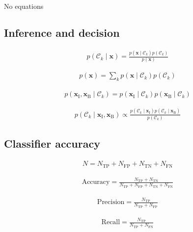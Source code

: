 \documentclass{article}
\begin{document}
No equations

\subsection{Inference and decision}

\begin{align*}
p\left(\mathcal{C}_k \mid \mathbf{x}\right) = \frac{p\left(\mathbf{x} \mid \mathcal{C}_k\right) p\left(\mathcal{C}_k\right)}{p(\mathbf{x})}
\tag{5.24}
\end{align*}

\begin{align*}
p(\mathbf{x}) = \sum_k p\left(\mathbf{x} \mid \mathcal{C}_k\right) p\left(\mathcal{C}_k\right)
\tag{5.25}
\end{align*}

\begin{align*}
p\left(\mathbf{x}_{\mathrm{I}}, \mathbf{x}_{\mathrm{B}} \mid \mathcal{C}_k\right) = p\left(\mathbf{x}_{\mathrm{I}} \mid \mathcal{C}_k\right) p\left(\mathbf{x}_{\mathrm{B}} \mid \mathcal{C}_k\right)
\tag{5.26}
\end{align*}

\begin{align*}
p\left(\mathcal{C}_k \mid \mathbf{x}_{\mathrm{I}}, \mathbf{x}_{\mathrm{B}}\right) \propto \frac{p\left(\mathcal{C}_k \mid \mathbf{x}_{\mathrm{I}}\right) p\left(\mathcal{C}_k \mid \mathbf{x}_{\mathrm{B}}\right)}{p\left(\mathcal{C}_k\right)}
\tag{5.27}
\end{align*}

\subsection{Classifier accuracy}

\begin{align*}
N = N_{\mathrm{TP}} + N_{\mathrm{FP}} + N_{\mathrm{TN}} + N_{\mathrm{FN}}
\tag{5.28}
\end{align*}

\begin{align*}
\text{Accuracy} = \frac{N_{\mathrm{TP}} + N_{\mathrm{TN}}}{N_{\mathrm{TP}} + N_{\mathrm{FP}} + N_{\mathrm{TN}} + N_{\mathrm{FN}}}
\tag{5.29}
\end{align*}

\begin{align*}
\text{Precision} = \frac{N_{\mathrm{TP}}}{N_{\mathrm{TP}} + N_{\mathrm{FP}}}
\tag{5.30}
\end{align*}

\begin{align*}
\text{Recall} = \frac{N_{\mathrm{TP}}}{N_{\mathrm{TP}} + N_{\mathrm{FN}}}
\tag{5.31}
\end{align*}
\end{document}
